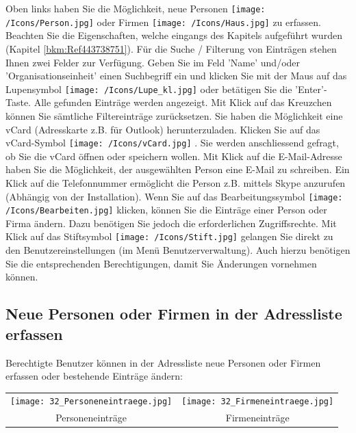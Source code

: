 Oben links haben Sie die Möglichkeit, neue Personen \texttt{[image: /Icons/Person.jpg]} oder Firmen \texttt{[image: /Icons/Haus.jpg]} zu erfassen. Beachten Sie die Eigenschaften, welche eingangs des Kapitels aufgeführt wurden (Kapitel \ref{bkm:Ref443738751}). \newline
Für die Suche / Filterung von Einträgen stehen Ihnen zwei Felder zur Verfügung. Geben Sie im Feld 'Name' und/oder 'Organisationseinheit'  einen Suchbegriff ein und klicken Sie mit der Maus auf das Lupensymbol \texttt{[image: /Icons/Lupe\_kl.jpg]}  oder betätigen Sie die 'Enter'-Taste. Alle gefunden Einträge werden angezeigt. Mit Klick auf das Kreuzchen  können Sie sämtliche Filtereinträge zurücksetzen. \newline
Sie haben die Möglichkeit eine vCard (Adresskarte z.B. für Outlook) herunterzuladen. Klicken Sie auf das vCard-Symbol \texttt{[image: /Icons/vCard.jpg]} . Sie werden anschliessend gefragt, ob Sie die vCard öffnen
oder speichern wollen.\newline
Mit Klick auf die E-Mail-Adresse  haben Sie die Möglichkeit, der ausgewählten Person eine E-Mail zu schreiben. Ein Klick auf die Telefonnummer  ermöglicht die Person z.B. mittels Skype anzurufen (Abhängig von der Installation).\newline
Wenn Sie auf das Bearbeitungssymbol \texttt{[image: /Icons/Bearbeiten.jpg]}  klicken, können Sie die Einträge einer Person oder Firma ändern. Dazu benötigen Sie jedoch die erforderlichen Zugriffsrechte. Mit Klick auf das Stiftsymbol \texttt{[image: /Icons/Stift.jpg]}  gelangen Sie direkt zu den Benutzereinstellungen (im Menü Benutzerverwaltung). Auch hierzu benötigen Sie die entsprechenden Berechtigungen, damit Sie Änderungen vornehmen können.

\subsection{Neue Personen oder Firmen in der Adressliste erfassen}
\label{bkm:Ref2018071901}
Berechtigte Benutzer können in der Adressliste neue Personen oder Firmen erfassen oder bestehende Einträge ändern:

\vspace{\baselineskip}

\begin{tabular}{cc} %
\texttt{[image: 32\_Personeneintraege.jpg]} & \texttt{[image: 32\_Firmeneintraege.jpg]} \\
Personeneinträge & Firmeneinträge \\
\end{tabular}


